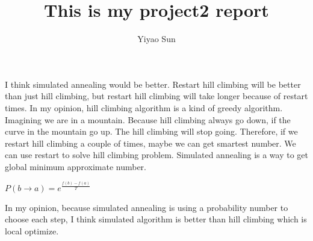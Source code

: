 \documentclass[12pt]{article}
\begin{document}
\author{Yiyao Sun}
\title{This is my project2 report}
\maketitle
\LARGE

I think simulated annealing would be better. Restart hill climbing will be better than just hill climbing, but restart hill climbing will take longer because of restart times. In my opinion, hill climbing algorithm is a kind of greedy algorithm. Imagining we are in a mountain. Because hill climbing always go down, if the curve in the mountain go up. The hill climbing will stop going. Therefore, if we restart hill climbing a couple of times, maybe we can get smartest number. 
We can use restart to solve hill climbing problem. Simulated annealing is a way to get global minimum approximate number. 
\begin{center}
	$P(b \rightarrow a) = e^\frac{f(b) - f(a)}{T}$
\end{center}
In my opinion, because simulated annealing is using a probability number to choose each step, I think simulated algorithm is better than hill climbing which is local optimize. 
\end{document}
